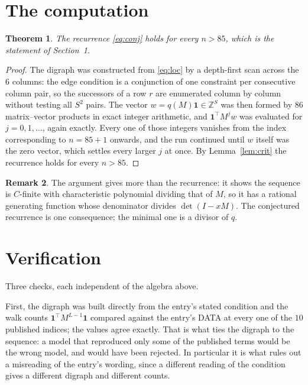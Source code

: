 \documentclass[11pt,a4paper]{article}
\theoremstyle{plain}
\newtheorem{theorem}{Theorem}
\theoremstyle{definition}
\newtheorem{remark}[theorem]{Remark}
\begin{document}
\section{The computation}

\begin{theorem}
The recurrence \eqref{eq:conj} holds for every $n>85$, which is the statement of
Section~1.
\end{theorem}

\begin{proof}
The digraph was constructed from \eqref{eq:loc} by a depth-first scan across the $6$
columns: the edge condition is a conjunction of one constraint per consecutive column
pair, so the successors of a row $r$ are enumerated column by column without testing all
$S^2$ pairs. The vector $w=q(M)\mathbf{1}\in\mathbb{Z}^{S}$ was then formed by $86$
matrix--vector products in exact integer arithmetic, and $\mathbf{1}^{\!\top}M^{j}w$ was
evaluated for $j=0,1,\dots$, again exactly. Every one of those integers vanishes from the
index corresponding to $n=85+1$ onwards, and the run continued until $w$ itself was the
zero vector, which settles every larger $j$ at once. By Lemma~\ref{lem:crit} the recurrence
holds for every $n>85$.
\end{proof}

\begin{remark}
The argument gives more than the recurrence: it shows the sequence is $C$-finite with
characteristic polynomial dividing that of $M$, so it has a rational generating function
whose denominator divides $\det(I-xM)$. The conjectured recurrence is one consequence; the
minimal one is a divisor of $q$.
\end{remark}

\section{Verification}

Three checks, each independent of the algebra above.

First, the digraph was built directly from the entry's stated condition and the walk counts
$\mathbf{1}^{\!\top}M^{L-1}\mathbf{1}$ compared against the entry's DATA at
every one of the $10$ published indices; the values agree exactly. That is what ties
the digraph to the sequence: a model that reproduced only some of the published terms would
be the wrong model, and would have been rejected. In particular it is what rules out a
misreading of the entry's wording, since a different reading of the condition gives a
different digraph and different counts.
\end{document}
